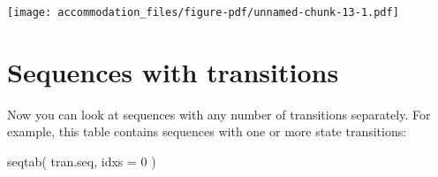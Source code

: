 \documentclass[
  letterpaper,
  DIV=11,
  numbers=noendperiod]{scrreprt}
\newenvironment{Shaded}{\begin{snugshade}}{\end{snugshade}}
\newcommand{\AttributeTok}[1]{\textcolor[rgb]{0.40,0.45,0.13}{#1}}
\newcommand{\DecValTok}[1]{\textcolor[rgb]{0.68,0.00,0.00}{#1}}
\newcommand{\FunctionTok}[1]{\textcolor[rgb]{0.28,0.35,0.67}{#1}}
\newcommand{\NormalTok}[1]{\textcolor[rgb]{0.00,0.23,0.31}{#1}}
\begin{document}
\texttt{[image: accommodation\_files/figure-pdf/unnamed-chunk-13-1.pdf]}

\section{Sequences with transitions}\label{sequences-with-transitions}

Now you can look at sequences with any number of transitions separately.
For example, this table contains sequences with one or more state
transitions:

\begin{Shaded}
\begin{Highlighting}[]
\FunctionTok{seqtab}\NormalTok{(}
\NormalTok{  tran.seq, }\AttributeTok{idxs =} \DecValTok{0}
\NormalTok{)}
\end{Highlighting}
\end{Shaded}
\end{document}
